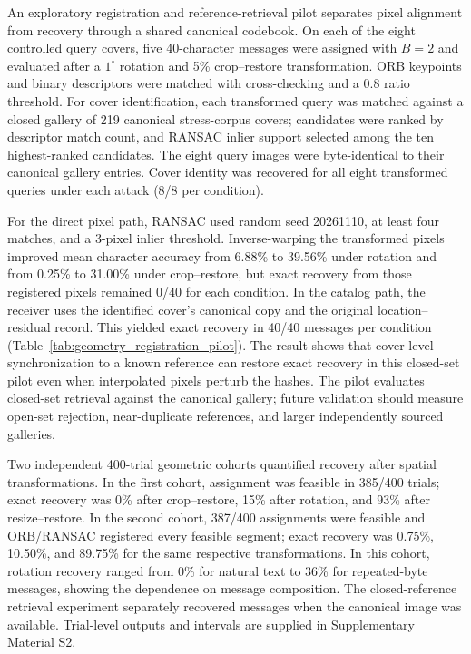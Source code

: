 \documentclass[preprint,12pt]{elsarticle}
\theoremstyle{plain}
\begin{document}
An exploratory registration and reference-retrieval pilot separates pixel
alignment from recovery through a shared canonical codebook. On each of the
eight controlled query covers, five 40-character messages were assigned with
$B=2$ and evaluated after a $1^\circ$ rotation and 5\% crop--restore
transformation. ORB keypoints and binary descriptors \cite{rublee2011orb}
were matched with cross-checking and a 0.8 ratio threshold. For cover
identification, each transformed query was matched against a closed gallery
of 219 canonical stress-corpus covers; candidates were ranked by descriptor
match count, and RANSAC inlier support selected among the ten highest-ranked
candidates. The eight query images were byte-identical to their canonical
gallery entries. Cover identity was recovered for all eight transformed
queries under each attack (8/8 per condition).

For the direct pixel path, RANSAC used random seed 20261110, at least four
matches, and a 3-pixel inlier threshold. Inverse-warping the transformed
pixels improved mean character accuracy from 6.88\% to 39.56\% under rotation
and from 0.25\% to 31.00\% under crop--restore, but exact recovery from those
registered pixels remained 0/40 for each condition. In the catalog path, the
receiver uses the identified cover's canonical copy and the original
location--residual record. This yielded exact recovery in 40/40 messages per
condition (Table~\ref{tab:geometry_registration_pilot}). The result shows
that cover-level synchronization to a known reference can restore exact
recovery in this closed-set pilot even when interpolated pixels perturb the
hashes. The pilot evaluates closed-set retrieval against the canonical gallery;
future validation should measure open-set rejection, near-duplicate
references, and larger independently sourced galleries.

\begin{table}[!t]
\centering
\small
\caption{Geometric pilot: closed-set cover identification in a 219-image gallery and message recovery over canonical references (40 messages per condition).}
\label{tab:geometry_registration_pilot}

\end{table}

Two independent 400-trial geometric cohorts quantified recovery after
spatial transformations. In the first cohort, assignment was feasible in
385/400 trials; exact recovery was 0\% after crop--restore, 15\% after
rotation, and 93\% after resize--restore. In the second cohort, 387/400
assignments were feasible and ORB/RANSAC registered every feasible segment;
exact recovery was 0.75\%, 10.50\%, and 89.75\% for the same respective
transformations. In this cohort, rotation recovery ranged from 0\% for
natural text to 36\% for repeated-byte messages, showing the dependence on
message composition. The closed-reference retrieval experiment separately
recovered messages when the canonical image was available. Trial-level
outputs and intervals are supplied in Supplementary Material S2.
\end{document}
